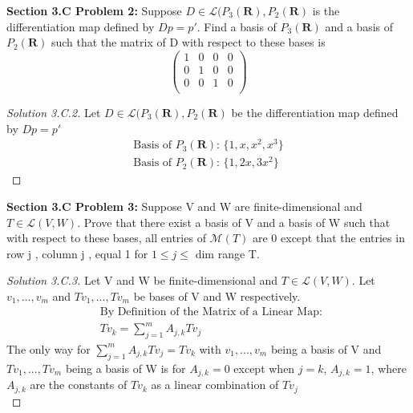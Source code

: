 \documentclass[12pt]{article}
\begin{document}
\newpage
\textbf{Section 3.C Problem 2: } Suppose $D \in \mathcal{L}(P_3(\textbf{R}),P_2(\textbf{R}) $ is the differentiation map defined by $Dp = p'$. Find a basis of $P_3(\textbf{R})$ and a basis of $P_2(\textbf{R})$ such that the matrix of D with respect to these bases is 
	$$\begin{pmatrix}
		1 & 0 & 0 & 0 \\
		0 & 1 & 0 & 0 \\
		0 & 0 & 1 & 0 \\
	\end{pmatrix}$$
	
	\begin{proof}[Solution 3.C.2]
		Let $D \in \mathcal{L}(P_3(\textbf{R}),P_2(\textbf{R}) $ be the differentiation map defined by $Dp = p'$
		\begin{align*}
			\text{Basis of $P_3(\textbf{R})$: } \{1,x,x^2,x^3\} \\
			\text{Basis of $P_2(\textbf{R})$: } \{1,2x,3x^2\} 
		\end{align*}
	\end{proof}

\vspace{\baselineskip}
\textbf{Section 3.C Problem 3: } Suppose V and W are finite-dimensional and $T \in \mathcal{L}(V,W)$. Prove that there exist a basis of V and a basis of W such that with respect to these bases, all entries of $\mathcal{M}(T)$ are 0 except that the entries in row j , column j , equal 1 for $1 \leq j \leq$ dim range T.
 

	\begin{proof}[Solution 3.C.3]
		Let V and W be finite-dimensional and $T \in \mathcal{L}(V,W)$. Let $v_1,...,v_m$ and $Tv_1, ..., Tv_m$ be bases of V and W respectively.
		\begin{align*}
			&\text{By Definition of the Matrix of a Linear Map: } \\
			&Tv_k = \sum_{j=1}^{m} A_{j,k}Tv_j
		\end{align*}
		The only way for $\sum_{j=1}^{m} A_{j,k}Tv_j = Tv_k$ with $v_1,...,v_m$ being a basis of V and $Tv_1, ..., Tv_m$ being a basis of W is for $A_{j,k} = 0$ except when $j=k$, $A_{j,k} = 1$, where $A_{j,k}$ are the constants of $Tv_k$ as a linear combination of $Tv_j$ \\
	\end{proof}
\end{document}

